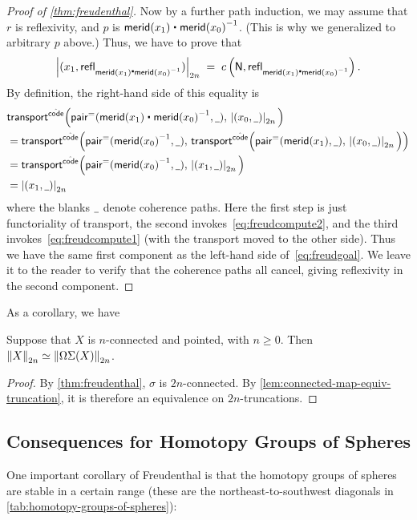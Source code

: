 \begin{proof}[Proof of \autoref{thm:freudenthal}]
  Now by a further path induction, we may assume that $r$ is reflexivity, and $p$ is $\merid(x_1) \ct \opp{\merid(x_0)}$.
  (This is why we generalized to arbitrary $p$ above.)
  Thus, we have to prove that
  \begin{equation}
    \tproj{2n}{(x_1, \refl{\merid(x_1) \ct \opp{\merid(x_0)}})}
    \;=\;
    c\left(\north,\refl{\merid(x_1) \ct \opp{\merid(x_0)}}\right).\label{eq:freudgoal}
  \end{equation}
  By definition, the right-hand side of this equality is
  \begin{align*}
    &\Transfib{\hat{\code}}{\pairpath(\merid(x_1) \ct \opp{\merid(x_0)}, \blank)}{\tproj{2n}{(x_0,\blank)}}\\
    &= \Transfib{\hat{\code}}{\pairpath(\opp{\merid(x_0)}, \blank)}
    {\Transfib{\hat{\code}}{\pairpath(\merid(x_1), \blank)}{\tproj{2n}{(x_0,\blank)}}}\\
    &= \Transfib{\hat{\code}}{\pairpath(\opp{\merid(x_0)}, \blank)}{\tproj{2n}{(x_1,\blank)}}\\
    &= \tproj{2n}{(x_1,\blank)}
  \end{align*}
  where the blanks $\blank$ denote coherence paths.
  Here the first step is just functoriality of transport, the second invokes~\eqref{eq:freudcompute2}, and the third invokes~\eqref{eq:freudcompute1} (with the transport moved to the other side).
  Thus we have the same first component as the left-hand side of~\eqref{eq:freudgoal}.
  We leave it to the reader to verify that the coherence paths all cancel, giving reflexivity in the second component.
\end{proof}

As a corollary, we have 
\begin{cor} \label{cor:freudenthal-equiv}
Suppose that $X$ is $n$-connected and pointed, with $n\geq 0$.
Then $\eqv{\trunc{2n}{X}}{\trunc{2n}{\Omega\susp(X)}}$.
\end{cor}
\begin{proof}
By \cref{thm:freudenthal}, $\sigma$ is $2n$-connected.  By
\cref{lem:connected-map-equiv-truncation}, it is therefore an
equivalence on $2n$-truncations.  
\end{proof}

\subsection{Consequences for Homotopy Groups of Spheres}

One important corollary of Freudenthal is that the homotopy groups of
spheres are stable in a certain range (these are the northeast-to-southwest diagonals
in \autoref{tab:homotopy-groups-of-spheres}):

